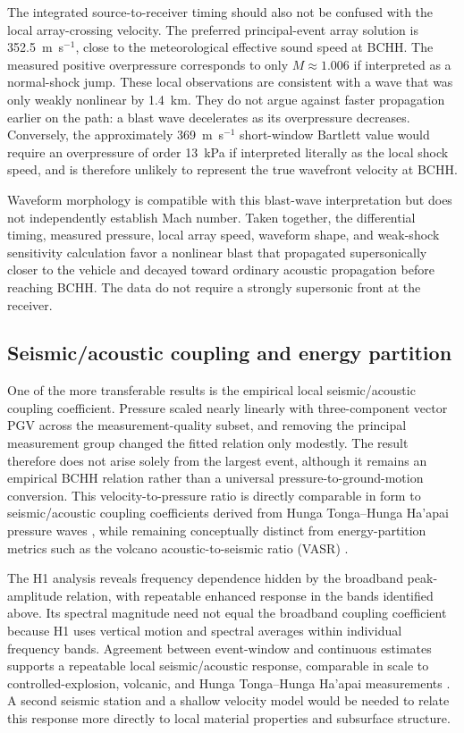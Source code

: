 \documentclass[]{seismica}
\begin{document}
The integrated source-to-receiver timing should also not be confused with the
local array-crossing velocity. The preferred principal-event array solution is
352.5~m~s$^{-1}$, close to the meteorological effective sound speed at BCHH.
The measured positive overpressure corresponds to only $M\approx1.006$ if
interpreted as a normal-shock jump. These local observations are consistent
with a wave that was only weakly nonlinear by 1.4~km. They do not argue against
faster propagation earlier on the path: a blast wave decelerates as its
overpressure decreases. Conversely, the approximately 369~m~s$^{-1}$
short-window Bartlett value would require an overpressure of order 13~kPa if
interpreted literally as the local shock speed, and is therefore unlikely to
represent the true wavefront velocity at BCHH.

Waveform morphology is compatible with this blast-wave interpretation but
does not independently establish Mach number. Taken together, the differential
timing, measured pressure, local array speed, waveform shape, and weak-shock
sensitivity calculation favor a nonlinear blast that propagated supersonically
closer to the vehicle and decayed toward ordinary acoustic propagation before
reaching BCHH. The data do not require a strongly supersonic front at the
receiver.

\subsection{Seismic/acoustic coupling and energy partition}

One of the more transferable results is the empirical local
seismic/acoustic coupling coefficient. Pressure scaled nearly linearly with
three-component vector PGV across the measurement-quality subset, and removing
the principal measurement group changed the fitted relation only modestly. The
result therefore does not arise solely from the largest event, although it
remains an empirical BCHH relation rather than a universal
pressure-to-ground-motion conversion. This velocity-to-pressure ratio is
directly comparable in form to seismic/acoustic coupling coefficients derived
from Hunga Tonga--Hunga Ha'apai pressure waves
\citep{anthony_hunga_coupling_2023,macpherson_hunga_coupling_2025}, while
remaining conceptually distinct from energy-partition metrics such as the
volcano acoustic-to-seismic ratio (VASR) \citep{johnson_aster_2005}.

The H1 analysis reveals frequency dependence hidden by the broadband
peak-amplitude relation, with repeatable enhanced response in the bands
identified above. Its spectral magnitude need not equal the broadband coupling
coefficient because H1 uses vertical motion and spectral averages within
individual frequency bands. Agreement between event-window and continuous
estimates supports a repeatable local seismic/acoustic response, comparable in
scale to controlled-explosion, volcanic, and Hunga Tonga--Hunga Ha'apai
measurements \citep{novoselov_ground_coupling_2020,anthony_hunga_coupling_2023,
macpherson_hunga_coupling_2025}. A second seismic station and a shallow
velocity model would be needed to relate this response more directly to local
material properties and subsurface structure.
\end{document}
